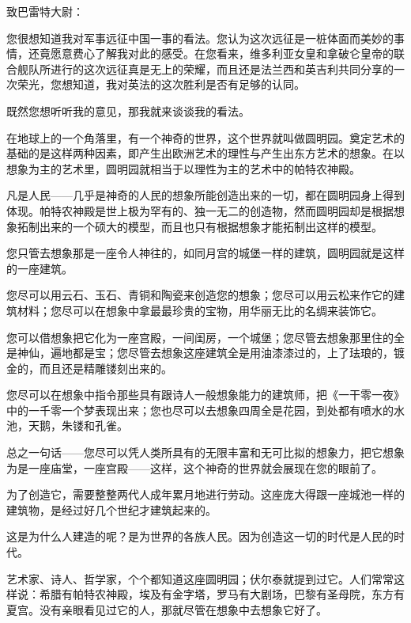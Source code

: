 \documentclass[12pt,UTF-8,openany]{ctexbook}
\begin{document}
\begin{normalsize}
    
    \noindent 致巴雷特大尉：
    
    \vspace{24pt}
    
    您很想知道我对军事远征中国一事的看法。您认为这次远征是一桩体面而美妙的事情，还竟愿意费心了解我对此的感受。在您看来，维多利亚女皇和拿破仑皇帝的联合舰队所进行的这次远征真是无上的荣耀，而且还是法兰西和英吉利共同分享的一次荣光，您想知道，我对英法的这次胜利是否有足够的认同。
    
    既然您想听听我的意见，那我就来谈谈我的看法。
    
    在地球上的一个角落里，有一个神奇的世界，这个世界就叫做圆明园。奠定艺术的基础的是这样两种因素，即产生出欧洲艺术的理性与产生出东方艺术的想象。在以想象为主的艺术里，圆明园就相当于以理性为主的艺术中的帕特农神殿。
    
    凡是人民——几乎是神奇的人民的想象所能创造出来的一切，都在圆明园身上得到体现。帕特农神殿是世上极为罕有的、独一无二的创造物，然而圆明园却是根据想象拓制出来的一个硕大的模型，而且也只有根据想象才能拓制出这样的模型。
    
    您只管去想象那是一座令人神往的，如同月宫的城堡一样的建筑，圆明园就是这样的一座建筑。
    
    您尽可以用云石、玉石、青铜和陶瓷来创造您的想象；您尽可以用云松来作它的建筑材料；您尽可以在想象中拿最最珍贵的宝物，用华丽无比的名绸来装饰它。
    
    您可以借想象把它化为一座宫殿，一间闺房，一个城堡；您尽管去想象那里住的全是神仙，遍地都是宝；您尽管去想象这座建筑全是用油漆漆过的，上了珐琅的，镀金的，而且还是精雕镂刻出来的。
    
    您尽可以在想象中指令那些具有跟诗人一般想象能力的建筑师，把《一干零一夜》中的一千零一个梦表现出来；您也尽可以去想象四周全是花园，到处都有喷水的水池，天鹅，朱镂和孔雀。
    
    总之一句话——您尽可以凭人类所具有的无限丰富和无可比拟的想象力，把它想象为是一座庙堂，一座宫殿——这样，这个神奇的世界就会展现在您的眼前了。
    
    为了创造它，需要整整两代人成年累月地进行劳动。这座庞大得跟一座城池一样的建筑物，是经过好几个世纪才建筑起来的。
    
    这是为什么人建造的呢？是为世界的各族人民。因为创造这一切的时代是人民的时代。
    
    艺术家、诗人、哲学家，个个都知道这座圆明园；伏尔泰就提到过它。人们常常这样说：希腊有帕特农神殿，埃及有金字塔，罗马有大剧场，巴黎有圣母院，东方有夏宫。没有亲眼看见过它的人，那就尽管在想象中去想象它好了。
    

\end{normalsize}
\end{document}
